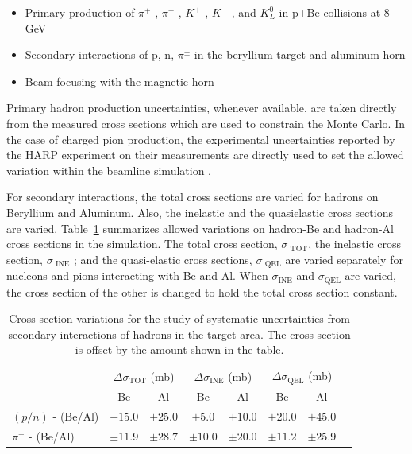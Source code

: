 \begin{itemize}
\item Primary production of $\pi^+$ , $\pi^-$ , $K^+$ , $K^−$ , and $K_L^0$ in p+Be collisions at 8 GeV
\item Secondary interactions of p, n, $\pi^{\pm}$ in the beryllium target and aluminum horn
\item Beam focusing with the magnetic horn
\end{itemize}

Primary hadron production uncertainties, whenever available, are taken directly from the
measured cross sections which are used to constrain the Monte Carlo. In the case
of charged pion production, the experimental uncertainties reported by the HARP experiment on
their measurements are directly used to set the allowed variation within the beamline simulation \cite{Catanesi:2007ab}.

For secondary interactions, the total cross sections are varied for hadrons on Beryllium and Aluminum.  Also, the inelastic and the quasielastic cross sections are varied.  Table~\ref{tab:flux_secondary_int_variations} summarizes allowed variations on hadron-Be and hadron-Al cross sections in the simulation. The total cross section, $\sigma_{\text{~TOT}}$, the inelastic cross section, $\sigma_{\text{~INE}}$ ; and the quasi-elastic cross sections, $\sigma_{\text{~QEL}}$ are varied separately for nucleons and pions interacting with Be and Al. When $\sigma_{\text{INE}}$ and $\sigma_{\text{QEL}}$ are varied, the cross section of the other is changed to hold the total cross section constant.

\begin{table}[h]
  \caption[BNB Secondary Interaction Variations]{Cross section variations for the study of systematic uncertainties from secondary interactions of hadrons in the target area.  The cross section is offset by the amount shown in the table.}
  \label{tab:flux_secondary_int_variations}
  \centering
  \begin{tabular}{l|ccccccc}
  \hline
  \hline
   &  \multicolumn{2}{c}{$\Delta \sigma_{\text{TOT}}$ (mb)} & \multicolumn{2}{c}{$\Delta \sigma_{\text{INE}}$ (mb)} & \multicolumn{2}{c}{$\Delta \sigma_{\text{QEL}}$ (mb)} \\
   &  Be & Al & Be & Al & Be & Al \\
  \hline
   $(p/n)$ - (Be/Al) & $\pm 15.0$ & $\pm 25.0$ & $\pm 5.0$ & $\pm 10.0$ & $\pm 20.0$ & $\pm 45.0$ \\
   $\pi^{\pm}$ - (Be/Al) & $\pm 11.9$ & $\pm 28.7$ & $\pm 10.0$ & $\pm 20.0$ & $\pm 11.2$ & $\pm 25.9$ \\
  \hline
  \end{tabular}
\end{table}

